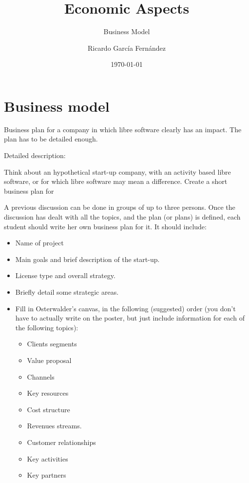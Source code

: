 \documentclass[11pt]{scrartcl}
\title{\textbf{Economic Aspects}}
\subtitle{Business Model}
\author{Ricardo Garc\'ia Fern\'andez}
\date{\today}
\begin{document}
\maketitle

\tableofcontents

\newpage

\section{Business model}

Business plan for a company in which libre software clearly has an impact. The plan has to be detailed enough. 

Detailed description:

Think about an hypothetical start-up company, with an activity based libre software, or for which libre software may mean a difference. Create a short business plan for 

A previous discussion can be done in groups of up to three persons. Once the discussion has dealt with all the topics, and the plan (or plans) is defined, each student should write her own business plan for it. It should include:

\begin{itemize}
    \item Name of project
    \item Main goals and brief description of the start-up.
    \item License type and overall strategy.
    \item Briefly detail some strategic areas.
    \item Fill in Osterwalder’s canvas, in the following (suggested) order (you don’t have to actually write on the poster, but just include information for each of the following topics):
    \begin{itemize}
        \item Clients segments
        \item Value proposal
        \item Channels
        \item Key resources
        \item Cost structure
        \item Revenues streams.
        \item Customer relationships
        \item Key activities
        \item Key partners
    \end{itemize}
\end{itemize}
\end{document}
